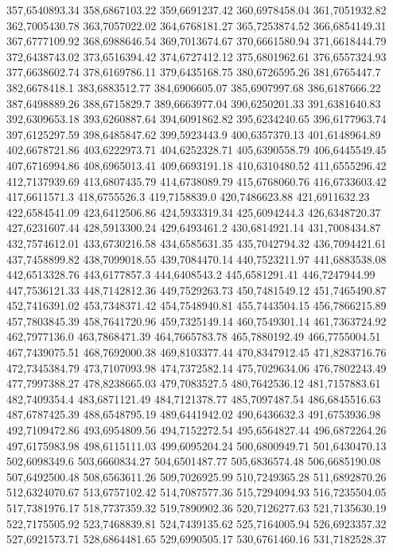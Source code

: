 357,6540893.34
358,6867103.22
359,6691237.42
360,6978458.04
361,7051932.82
362,7005430.78
363,7057022.02
364,6768181.27
365,7253874.52
366,6854149.31
367,6777109.92
368,6988646.54
369,7013674.67
370,6661580.94
371,6618444.79
372,6438743.02
373,6516394.42
374,6727412.12
375,6801962.61
376,6557324.93
377,6638602.74
378,6169786.11
379,6435168.75
380,6726595.26
381,6765447.7
382,6678418.1
383,6883512.77
384,6906605.07
385,6907997.68
386,6187666.22
387,6498889.26
388,6715829.7
389,6663977.04
390,6250201.33
391,6381640.83
392,6309653.18
393,6260887.64
394,6091862.82
395,6234240.65
396,6177963.74
397,6125297.59
398,6485847.62
399,5923443.9
400,6357370.13
401,6148964.89
402,6678721.86
403,6222973.71
404,6252328.71
405,6390558.79
406,6445549.45
407,6716994.86
408,6965013.41
409,6693191.18
410,6310480.52
411,6555296.42
412,7137939.69
413,6807435.79
414,6738089.79
415,6768060.76
416,6733603.42
417,6611571.3
418,6755526.3
419,7158839.0
420,7486623.88
421,6911632.23
422,6584541.09
423,6412506.86
424,5933319.34
425,6094244.3
426,6348720.37
427,6231607.44
428,5913300.24
429,6493461.2
430,6814921.14
431,7008434.87
432,7574612.01
433,6730216.58
434,6585631.35
435,7042794.32
436,7094421.61
437,7458899.82
438,7099018.55
439,7084470.14
440,7523211.97
441,6883538.08
442,6513328.76
443,6177857.3
444,6408543.2
445,6581291.41
446,7247944.99
447,7536121.33
448,7142812.36
449,7529263.73
450,7481549.12
451,7465490.87
452,7416391.02
453,7348371.42
454,7548940.81
455,7443504.15
456,7866215.89
457,7803845.39
458,7641720.96
459,7325149.14
460,7549301.14
461,7363724.92
462,7977136.0
463,7868471.39
464,7665783.78
465,7880192.49
466,7755004.51
467,7439075.51
468,7692000.38
469,8103377.44
470,8347912.45
471,8283716.76
472,7345384.79
473,7107093.98
474,7372582.14
475,7029634.06
476,7802243.49
477,7997388.27
478,8238665.03
479,7083527.5
480,7642536.12
481,7157883.61
482,7409354.4
483,6871121.49
484,7121378.77
485,7097487.54
486,6845516.63
487,6787425.39
488,6548795.19
489,6441942.02
490,6436632.3
491,6753936.98
492,7109472.86
493,6954809.56
494,7152272.54
495,6564827.44
496,6872264.26
497,6175983.98
498,6115111.03
499,6095204.24
500,6800949.71
501,6430470.13
502,6098349.6
503,6660834.27
504,6501487.77
505,6836574.48
506,6685190.08
507,6492500.48
508,6563611.26
509,7026925.99
510,7249365.28
511,6892870.26
512,6324070.67
513,6757102.42
514,7087577.36
515,7294094.93
516,7235504.05
517,7381976.17
518,7737359.32
519,7890902.36
520,7126277.63
521,7135630.19
522,7175505.92
523,7468839.81
524,7439135.62
525,7164005.94
526,6923357.32
527,6921573.71
528,6864481.65
529,6990505.17
530,6761460.16
531,7182528.37
